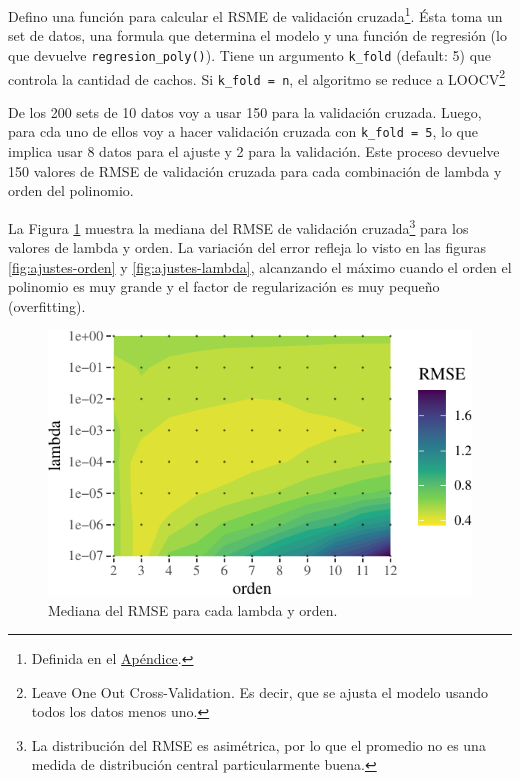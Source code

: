 \documentclass[]{tufte-handout}
\begin{document}
Defino una función para calcular el RSME de validación cruzada\footnote{Definida en el \protect\hyperlink{def-cv}{Apéndice}.}. Ésta toma un set de datos, una formula que determina el modelo y una función de regresión (lo que devuelve \texttt{regresion\_poly()}). Tiene un argumento \texttt{k\_fold} (default: 5) que controla la cantidad de cachos. Si \texttt{k\_fold\ =\ n}, el algoritmo se reduce a LOOCV\footnote{Leave One Out Cross-Validation. Es decir, que se ajusta el modelo usando todos los datos menos uno.}

De los 200 sets de 10 datos voy a usar 150 para la validación cruzada. Luego, para cda uno de ellos voy a hacer validación cruzada con \texttt{k\_fold\ =\ 5}, lo que implica usar 8 datos para el ajuste y 2 para la validación. Este proceso devuelve 150 valores de RMSE de validación cruzada para cada combinación de lambda y orden del polinomio.

La Figura \ref{fig:rmse-campo} muestra la mediana del RMSE de validación cruzada\footnote{La distribución del RMSE es asimétrica, por lo que el promedio no es una medida de distribución central particularmente buena.} para los valores de lambda y orden. La variación del error refleja lo visto en las figuras \ref{fig:ajustes-orden} y \ref{fig:ajustes-lambda}, alcanzando el máximo cuando el orden el polinomio es muy grande y el factor de regularización es muy pequeño (overfitting).

\begin{figure}
\includegraphics{README_files/figure-latex/rmse-campo-1} \caption[Mediana del RMSE para cada lambda y orden]{Mediana del RMSE para cada lambda y orden.}\label{fig:rmse-campo}
\end{figure}
\end{document}
